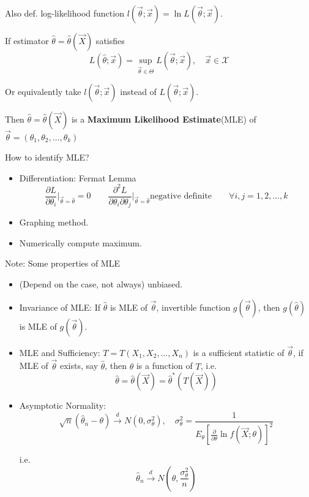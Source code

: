 \documentclass[11pt,a4paper]{ctexart}
\numberwithin{equation}{section}%
\begin{document}
    Also def. log-likelihood function $l(\vec{\theta};\vec{x})=\ln L(\vec{\theta};\vec{x})$.

    If estimator $\hat{\theta}=\hat{\theta}(\vec{X})$ satisfies
    \[
        L(\hat{\theta};\vec{x})=\sup_{\vec{\theta}\in\Theta}L(\vec{\theta};\vec{x}),\quad \vec{x}\in\mathscr{X}
    \]

    Or equivalently take $l(\vec{\theta};\vec{x})$ instead of $L(\vec{\theta};\vec{x})$.

    Then $\hat{\theta}=\hat{\theta}(\vec{X})$ is a \textbf{Maximum Likelihood Estimate}(MLE) of $\vec{\theta}=(\theta_1,\theta_2,\ldots,\theta_k)$

    How to identify MLE?
    \begin{itemize}
        \item Differentiation: Fermat Lemma
        \[
            \frac{\partial L}{\partial \theta_i}\bigg|_{\vec{\theta}=\hat{\theta}}=0\qquad \frac{\partial^2 L}{\partial \theta_i \partial \theta_j}\bigg|_{\vec{\theta}=\hat{\theta}}\text{negative definite}\qquad \forall i,j=1,2,\ldots,k
        \]
        \item Graphing method.
        \item Numerically compute maximum.
    \end{itemize}

    Note: Some properties of MLE
    \begin{itemize}
        \item (Depend on the case, not always) unbiased.
        \item Invariance of MLE: If $\hat{\theta}$ is MLE of $\vec{\theta}$, invertible function $g(\vec{\theta})$, then $g(\hat{\theta})$ is MLE of $g(\vec{\theta})$.
        \item MLE and Sufficiency: $T=T(X_1,X_2,\ldots,X_n)$ is a sufficient statistic of $\vec{\theta}$, if MLE of $\vec{\theta}$ exists, say $\hat{\theta}$, then $\hat{\theta}$ is a function of $T$, i.e.
        \[  
            \hat{\theta}=\hat{\theta}(\vec{X})=\hat{\theta}^*(T(\vec{X}))    
        \]
        \item Asymptotic Normality: 
        \[
            \sqrt{n}(\hat{\theta}_n-\theta) \xrightarrow[]{d}N(0,\sigma^2_\theta),\quad \sigma^2_\theta=\frac{1}{E_\theta[\frac{\partial}{\partial\theta}\ln f(\vec{X};\theta)]^2}   
        \]

        i.e.
        \[
            \hat{\theta}_n\xrightarrow[]{d}N(\theta,\frac{\sigma^2_\theta}{n})    
        \]
        
    \end{itemize}
\end{document}
